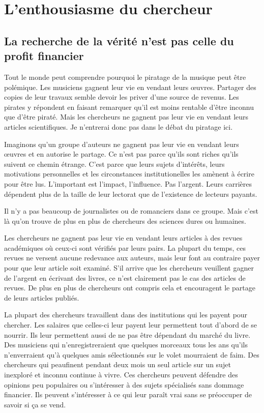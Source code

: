 \chapter{L'enthousiasme du chercheur}\label{cherch}

\section{La recherche de la vérité n'est pas celle du profit financier}
Tout le monde peut comprendre pourquoi le piratage de la musique peut être polémique. Les musiciens gagnent leur vie en vendant leurs œuvres. Partager des copies de leur travaux semble devoir les priver d'une source de revenus. Les pirates y répondent en faisant remarquer qu'il est moins rentable d'être inconnu que d'être piraté. Mais les chercheurs ne gagnent pas leur vie en vendant leurs articles scientifiques. Je n'entrerai donc pas dans le débat du piratage ici. 

Imaginons qu'un groupe d'auteurs ne gagnent pas leur vie en vendant leurs œuvres et en autorise le partage. Ce n'est pas parce qu'ils sont riches qu'ils suivent ce chemin étrange. C'est parce que leurs sujets d'intérêts, leurs motivations personnelles et les circonstances institutionelles les amènent à écrire pour être lus. L'important est l'impact, l'influence. Pas l'argent. Leurs carrières dépendent plus de la taille de leur lectorat que de l'existence de lecteurs payants.

Il n'y a pas beaucoup de journalistes ou de romanciers dans ce groupe. Mais c'est là qu'on trouve de plus en plus de chercheurs des sciences dures ou humaines.

Les chercheurs ne gagnent pas leur vie en vendant leurs articles à des revues académiques où ceux-ci sont vérifiés par leurs pairs. La plupart du temps, ces revues ne versent aucune redevance aux auteurs, mais leur font au contraire payer pour que leur article soit examiné. S'il arrive que les chercheurs veuillent gagner de l'argent en écrivant des livres,  ce n'est clairement pas le cas des articles de revues. De plus en plus de chercheurs ont compris cela et encouragent le partage de leurs articles publiés. 

La plupart des chercheurs travaillent dans des institutions qui les payent pour chercher. Les salaires que celles-ci leur payent leur permettent tout d'abord de se nourrir. Ils leur permettent aussi de ne pas être dépendant du marché du livre. Des musiciens qui n'enregistreraient que quelques morceaux tous les ans qu'ils n'enverraient qu'à quelques amis sélectionnés sur le volet mourraient de faim. Des chercheurs qui peaufinent pendant deux mois un seul article sur un sujet inexploré et inconnu continue à vivre. Ces chercheurs peuvent défendre des opinions peu populaires ou s'intéresser à des sujets spécialisés sans dommage financier. Ils peuvent s'intéresser à ce qui leur paraît vrai sans se préoccuper de savoir si ça se vend.

